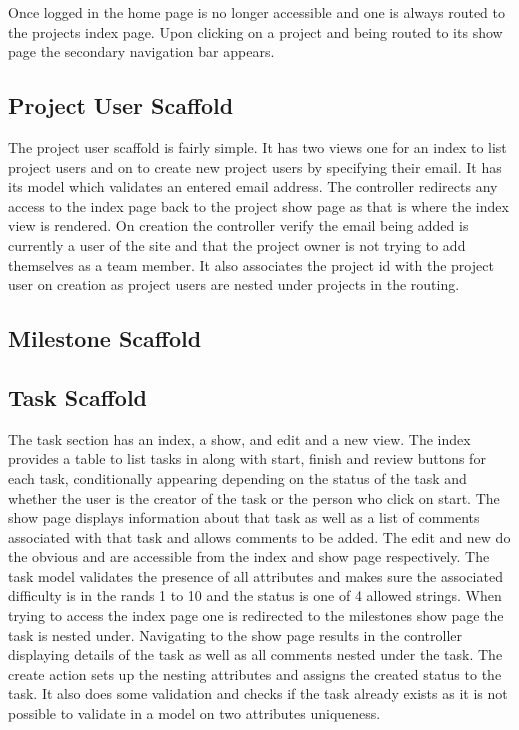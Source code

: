 \documentclass[a4wide, 11pt]{article}
\begin{document}
Once logged in the home page is no longer accessible and one is always routed to the projects index page. Upon clicking on a project and being routed to its show page the secondary navigation bar appears.

\subsection{Project User Scaffold}
The project user scaffold is fairly simple. It has two views one for an index to list project users and on to create new project users by specifying their email. It has its model which validates an entered email address. The controller redirects any access to the index page back to the project show page  as that is where the index view is rendered. On creation the controller verify the email being added is currently a user of the site and that the project owner is not trying to add themselves as a team member. It also associates the project id with the project user on creation as project users are nested under projects in the routing.

\subsection{Milestone Scaffold}

\subsection{Task Scaffold}
The task section has an index, a show, and edit and a new view. The index provides a table to list tasks in along with start, finish and review buttons for each task, conditionally appearing depending on the status of the task and whether the user is the creator of the task or the person who click on start. The show page displays information about that task as well as a list of comments associated with that task and allows comments to be added. The edit and new do the obvious and are accessible from the index and show page respectively. The task model validates the presence of all attributes and makes sure the associated difficulty is in the rands 1 to 10 and the status is one of 4 allowed strings. When trying to access the index page one is redirected to the milestones show page the task is nested under. Navigating to the show page results in the controller displaying details of the task as well as all comments nested under the task. The create action sets up the nesting attributes and assigns the created status to the task. It also does some validation and checks if the task already exists as it is not possible to validate in a model on two attributes uniqueness. 
\end{document}

